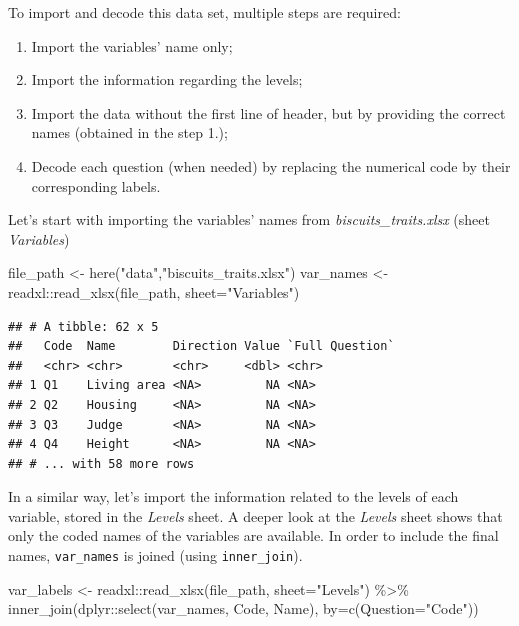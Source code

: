 \documentclass[
]{krantz}
\makeatletter
\newenvironment{Shaded}{\begin{snugshade}}{\end{snugshade}}
\newcommand{\AttributeTok}[1]{\textcolor[rgb]{0.61,0.61,0.61}{#1}}
\newcommand{\FunctionTok}[1]{\textcolor[rgb]{0,0,0}{#1}}
\newcommand{\NormalTok}[1]{#1}
\newcommand{\OtherTok}[1]{\textcolor[rgb]{0.37,0.37,0.37}{#1}}
\newcommand{\SpecialCharTok}[1]{\textcolor[rgb]{0,0,0}{#1}}
\newcommand{\StringTok}[1]{\textcolor[rgb]{0.5,0.5,0.5}{#1}}
\providecommand{\tightlist}{%
  \setlength{\itemsep}{0pt}\setlength{\parskip}{0pt}}
\newenvironment{kframe}{%
\medskip{}
\setlength{\fboxsep}{.8em}
 \def\at@end@of@kframe{}%
 \ifinner\ifhmode%
  \def\at@end@of@kframe{\end{minipage}}%
  \begin{minipage}{\columnwidth}%
 \fi\fi%
 \def\FrameCommand##1{\hskip\@totalleftmargin \hskip-\fboxsep
 \colorbox{shadecolor}{##1}\hskip-\fboxsep
     \hskip-\linewidth \hskip-\@totalleftmargin \hskip\columnwidth}%
 \MakeFramed {\advance\hsize-\width
   \@totalleftmargin\z@ \linewidth\hsize
   \@setminipage}}%
 {\par\unskip\endMakeFramed%
 \at@end@of@kframe}
\renewenvironment{Shaded}{\begin{kframe}}{\end{kframe}}
\makeatother
\begin{document}
To import and decode this data set, multiple steps are required:

\begin{enumerate}
\def\labelenumi{\arabic{enumi}.}
\tightlist
\item
  Import the variables' name only;
\item
  Import the information regarding the levels;
\item
  Import the data without the first line of header, but by providing the correct names (obtained in the step 1.);
\item
  Decode each question (when needed) by replacing the numerical code by their corresponding labels.
\end{enumerate}

Let's start with importing the variables' names from \emph{biscuits\_traits.xlsx} (sheet \emph{Variables})

\begin{Shaded}
\begin{Highlighting}[]
\NormalTok{file\_path }\OtherTok{\textless{}{-}} \FunctionTok{here}\NormalTok{(}\StringTok{"data"}\NormalTok{,}\StringTok{"biscuits\_traits.xlsx"}\NormalTok{) }
\NormalTok{var\_names }\OtherTok{\textless{}{-}}\NormalTok{ readxl}\SpecialCharTok{::}\FunctionTok{read\_xlsx}\NormalTok{(file\_path, }\AttributeTok{sheet=}\StringTok{"Variables"}\NormalTok{)}
\end{Highlighting}
\end{Shaded}

\begin{verbatim}
## # A tibble: 62 x 5
##   Code  Name        Direction Value `Full Question`
##   <chr> <chr>       <chr>     <dbl> <chr>          
## 1 Q1    Living area <NA>         NA <NA>           
## 2 Q2    Housing     <NA>         NA <NA>           
## 3 Q3    Judge       <NA>         NA <NA>           
## 4 Q4    Height      <NA>         NA <NA>           
## # ... with 58 more rows
\end{verbatim}

In a similar way, let's import the information related to the levels of each variable, stored in the \emph{Levels} sheet.
A deeper look at the \emph{Levels} sheet shows that only the coded names of the variables are available. In order to include the final names, \texttt{var\_names} is joined (using \texttt{inner\_join}).

\begin{Shaded}
\begin{Highlighting}[]
\NormalTok{var\_labels }\OtherTok{\textless{}{-}}\NormalTok{ readxl}\SpecialCharTok{::}\FunctionTok{read\_xlsx}\NormalTok{(file\_path, }\AttributeTok{sheet=}\StringTok{"Levels"}\NormalTok{) }\SpecialCharTok{\%\textgreater{}\%} 
  \FunctionTok{inner\_join}\NormalTok{(dplyr}\SpecialCharTok{::}\FunctionTok{select}\NormalTok{(var\_names, Code, Name), }
             \AttributeTok{by=}\FunctionTok{c}\NormalTok{(}\AttributeTok{Question=}\StringTok{"Code"}\NormalTok{))}
\end{Highlighting}
\end{Shaded}
\end{document}
